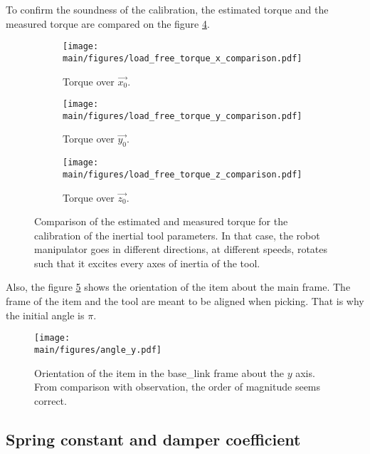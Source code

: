 \documentclass[/home/francois/latex/report/main.tex]{subfiles}
\begin{document}
To confirm the soundness of the calibration, the estimated torque and the measured torque are compared on the figure \ref{fig:results:calibration:torque}.

\begin{figure}[h]
\centering
\begin{subfigure}{0.49\textwidth}
\centering
\texttt{[image: \\main/figures/load\_free\_torque\_x\_comparison.pdf]}
\caption{Torque over $\overrightarrow{x_0}$.}
\label{fig:results:calibration:torque-x}
\end{subfigure}
\begin{subfigure}{0.49\textwidth}
\centering
\texttt{[image: \\main/figures/load\_free\_torque\_y\_comparison.pdf]}
\caption{Torque over $\overrightarrow{y_0}$.}
\label{fig:results:calibration:torque-y}
\end{subfigure}
\begin{subfigure}{0.51\textwidth}
\centering
\texttt{[image: \\main/figures/load\_free\_torque\_z\_comparison.pdf]}
\caption{Torque over $\overrightarrow{z_0}$.}
\label{fig:results:calibration:torque-z}
\end{subfigure}
\caption{Comparison of the estimated and measured torque for the calibration of the inertial tool parameters. In that case, the robot manipulator goes in different directions, at different speeds, rotates such that it excites every axes of inertia of the tool. \label{fig:results:calibration:torque}}
\end{figure}

Also, the figure \ref{fig:results:calibration:angle} shows the orientation of the item about the main frame. The frame of the item and the tool are meant to be aligned when picking. That is why the initial angle is $\pi$.

\begin{figure}[h]
  \centering
  \texttt{[image: \\main/figures/angle\_y.pdf]}
  \caption{Orientation of the item in the base\_link frame about the $y$ axis. From comparison with observation, the order of magnitude seems correct.}
  \label{fig:results:calibration:angle}
\end{figure}

\subsection{Spring constant and damper coefficient}
\end{document}
